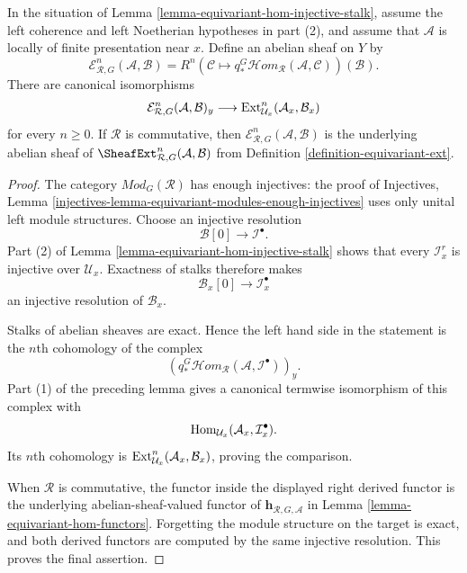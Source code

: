 \begin{lemma}
\label{lemma-equivariant-ext-stalk}
\begin{reference}
\cite[Chapter V, \S 5.6, formula (5.6.10), p. 215]{Tohoku}
\end{reference}
In the situation of Lemma \ref{lemma-equivariant-hom-injective-stalk},
assume the left coherence and left Noetherian hypotheses in part (2), and
assume that $\mathcal A$ is locally of finite presentation near $x$. Define
an abelian sheaf on $Y$ by
$$
\mathcal E^n_{\mathcal R,G}(\mathcal A,\mathcal B)
=
R^n\left(
\mathcal C\longmapsto
q_*^G\mathcal H\!om_{\mathcal R}(\mathcal A,\mathcal C)
\right)(\mathcal B).
$$
There are canonical isomorphisms
$$
\mathcal E^n_{\mathcal R,G}(\mathcal A,\mathcal B)_y
\longrightarrow
\mathop{\rm Ext}\nolimits^n_{\mathcal U_x}
(\mathcal A_x,\mathcal B_x)
$$
for every $n\geq 0$. If $\mathcal R$ is commutative, then
$\mathcal E^n_{\mathcal R,G}(\mathcal A,\mathcal B)$ is the underlying
abelian sheaf of
$\SheafExt^n_{\mathcal R,G}(\mathcal A,\mathcal B)$ from Definition
\ref{definition-equivariant-ext}.
\end{lemma}

\begin{proof}
The category $\textit{Mod}_G(\mathcal R)$ has enough injectives: the proof
of Injectives, Lemma
\ref{injectives-lemma-equivariant-modules-enough-injectives} uses only
unital left module structures. Choose an injective resolution
$$
\mathcal B[0]\longrightarrow\mathcal I^\bullet.
$$
Part (2) of Lemma \ref{lemma-equivariant-hom-injective-stalk} shows that
every $\mathcal I^r_x$ is injective over $\mathcal U_x$. Exactness of
stalks therefore makes
$$
\mathcal B_x[0]\longrightarrow\mathcal I^\bullet_x
$$
an injective resolution of $\mathcal B_x$.

Stalks of abelian sheaves are exact. Hence the left hand side in the
statement is the $n$th cohomology of the complex
$$
\left(
q_*^G\mathcal H\!om_{\mathcal R}
(\mathcal A,\mathcal I^\bullet)
\right)_y.
$$
Part (1) of the preceding lemma gives a canonical termwise isomorphism of
this complex with
$$
\mathop{\rm Hom}\nolimits_{\mathcal U_x}
(\mathcal A_x,\mathcal I^\bullet_x).
$$
Its $n$th cohomology is
$\mathop{\rm Ext}\nolimits^n_{\mathcal U_x}
(\mathcal A_x,\mathcal B_x)$, proving the comparison.

When $\mathcal R$ is commutative, the functor inside the displayed right
derived functor is the underlying abelian-sheaf-valued functor of
$\mathbf h_{\mathcal R,G,\mathcal A}$ in Lemma
\ref{lemma-equivariant-hom-functors}. Forgetting the module structure on
the target is exact, and both derived functors are computed by the same
injective resolution. This proves the final assertion.
\end{proof}


